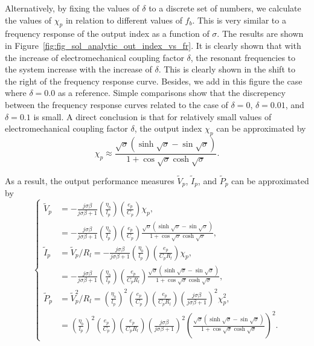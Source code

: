 \documentclass{article}
\begin{document}
Alternatively, by fixing the values of $\delta$ to a discrete set of numbers, we calculate the values of $\chi_p$ in relation to different values of $f_b$. This is very similar to a frequency response of the output index as a function of $\sigma$. The results are shown in Figure~\ref{fig:fig_sol_analytic_out_index_vs_fr}. It is clearly shown that with the increase of electromechanical coupling factor $\delta$, the resonant frequencies to the system increase with the increase of $\delta$. This is clearly shown in the shift to the right of the frequency response curve. Besides, we add in this figure the case where $\delta = 0.0$ as a reference. Simple comparisons show that the discrepency between the frequency response curves related to the case of $\delta = 0$, $\delta=0.01$, and $\delta = 0.1$ is small. A direct conclusion is that for relatively small values of electromechanical coupling factor $\delta$, the output index $\chi_p$ can be approximated by 
\begin{equation}
    \chi_p \approx \frac{ \sqrt{\sigma} \left( \sinh\sqrt{\sigma} - \sin\sqrt{\sigma} \right) }{ 1 + \cos\sqrt{\sigma } \cosh\sqrt{\sigma } }.
\end{equation}

As a result, the output performance measures $\tilde{V}_p$, $\tilde{I}_p$, and $\tilde{P}_p$ can be approximated by 
\begin{equation}
    \left\{\begin{aligned}
        \tilde{V}_p &= - \frac{j \sigma \beta}{j \sigma \beta + 1} \left(\frac{\eta_b}{l_p}\right) \left(\frac{e_p}{C_p}\right) \chi_p , \\
        &= - \frac{j \sigma \beta}{j \sigma \beta + 1} \left(\frac{\eta_b}{l_p}\right) \left(\frac{e_p}{C_p}\right) \frac{ \sqrt{\sigma} \left( \sinh\sqrt{\sigma} - \sin\sqrt{\sigma} \right) }{ 1 + \cos\sqrt{\sigma } \cosh\sqrt{\sigma } } , \\
        \tilde{I}_p &=  \tilde{V}_p / R_l = - \frac{ j \sigma \beta } {j \sigma \beta + 1} \left( \frac{\eta_b}{l_p} \right) \left( \frac{e_p}{C_p R_l} \right) \chi_p , \\
        &= - \frac{ j \sigma \beta } {j \sigma \beta + 1} \left( \frac{\eta_b}{l_p} \right) \left( \frac{e_p}{C_p R_l} \right) \frac{ \sqrt{\sigma} \left( \sinh\sqrt{\sigma} - \sin\sqrt{\sigma} \right) }{ 1 + \cos\sqrt{\sigma } \cosh\sqrt{\sigma } }, \\
        \tilde{P}_p &=  \tilde{V}_p^2 / R_l = \left(\frac{\eta_b}{l_p}\right)^2 \left(\frac{e_p}{C_p}\right) \left( \frac{e_p}{C_p R_l} \right) \left( \frac{ j \sigma \beta}{ j \sigma \beta + 1 } \right)^2 \chi_p^2, \\
        &= \left(\frac{\eta_b}{l_p}\right)^2 \left(\frac{e_p}{C_p}\right) \left( \frac{e_p}{C_p R_l} \right) \left( \frac{ j \sigma \beta}{ j \sigma \beta + 1 } \right)^2 \left( \frac{ \sqrt{\sigma} \left( \sinh\sqrt{\sigma} - \sin\sqrt{\sigma} \right) }{ 1 + \cos\sqrt{\sigma } \cosh\sqrt{\sigma } } \right)^2.
    \end{aligned}\right.
    \label{eq:eq_peh_perfs_compact_form_approx}
\end{equation}
\end{document}
